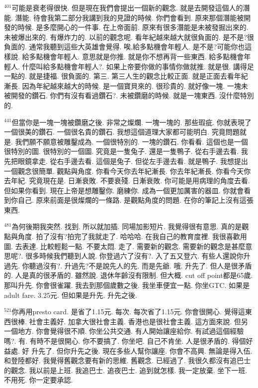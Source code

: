 \documentclass{book}
\begin{document}
$^{401}$可能是衰老得很快.
但是現在我們會提出一個新的觀念.
就是去開發這個人的潛能.
潛能.
待會我第二部分我講到我的見證的時候.
你們會看到.
原來那個潛能被開發的時候.
是多麼開心的一件事.
在上帝面前.
原來有很多潛能是未被發掘出來的.
未被爆出來的.
有爆炸力的.
以前的觀念呢.
看年紀越來越大就很負面的.
是不是?很負面的.
通常我聽到這些大英雄會覺得.
唉,給多點機會年輕人.
是不是?可能你也這樣說.
給多點機會年輕人.
意思就是你推.
就是你不想再背一些東西.
給多點機會年輕人.
什麼叫給多點機會年輕人?.
如果上帝要你做的事情你做就推.
就是很.
講得足一點的.
就是捷福.
很負面的.
第三.
第三人生的觀念比較正面.
就是正面去看年紀漸長.
因為年紀越來越大的時候.
是一個寶貝來的.
很珍貴的.
就好像一塊.
一塊未被開發的鑽石.
你們有沒有看過鑽石?.
未被鑽磨的時候.
就是一塊東西.
沒什麼特別的.

$^{441}$但當你是一塊一塊被鑽磨之後.
非常之燦爛.
一塊一塊的.
那些瑕疵.
你就表現了一個很美的鑽石.
一個很名貴的鑽石.
我想這個道理大家都可能明白.
究竟問題就是.
我們願不願意被雕鑿成為.
一個很特別的.
一塊的鑽石.
你看看.
這個也是一個很特別的圖.
很特別的一個圖.
究竟是一隻兔子.
還是一隻鴨子.
從右手邊去看.
我先把眼鏡拿走.
從右手邊去看.
這個是兔子.
但從左手邊去看.
就是鴨子.
我想提出一個觀念很簡單.
觀點與角度.
你看今天你去年紀漸長.
你去年紀漸長.
你看今天你去年紀.
究竟現在是.
日漸衰敗.
不要衰殘.
日漸衰敗.
你可能是用病理的角度去看.
但如果你看到.
現在上帝是想雕鑿你.
磨練你.
成為一個更加厲害的器皿.
你就會看到你自己.
原來前面是很燦爛的一條路.
是觀點角度的問題.
在你的筆記上沒有這張東西.

$^{481}$為何後期我突然.
找到.
所以就加插.
同場加影短片.
我覺得很有意思.
真的是觀點與角度.
拍了沒有?拍完了我就走了.
哈哈哈.
在我自己的教育度裡.
我很喜歡用圖.
去表達.
比較輕鬆一點.
不要太悶.
走了.
需要新的觀念.
需要新的觀念是甚麼意思呢?.
很多時候我們聽到人說.
你登過六了沒有?.
入了五又登六.
有些人還說你升過先.
你聽過沒有?.
升過先?不是說先人的先.
而是先爺.
哦.
升先了.
但人是很矛盾的.
人是真的很矛盾的.
雖然說.
退休年齡沒有限制.
但大概.
cut off point都是65歲.
那叫升先.
你會很雀躍.
我去到那個歲數之後.
我坐車便宜一點.
你坐GTC.
如果是adult fare.
3.25元.
但如果是升先.
升先之後.

$^{521}$你再用presto card.
是省了1.15元.
每次.
每次省了1.15元.
你會很開心.
覺得這東西很棒.
社會主義好.
加拿大很社會主義.
香港也是很社會主義.
這方面來說.
但另一個地方.
你會覺得很不順.
你坐公共交通.
有人開始讓座給你.
有試過這個經驗嗎?.
有.
有時不是很開心.
你不要搞了.
你坐吧.
自己不肯坐.
人是很矛盾的.
得個好益處.
好 升先了.
但你升先之後.
現在多些人幫你讓座.
你會不高興.
無論是得入伍.
和登陸都好.
我覺得舊觀念要有新的思維.
舊觀念.
已經過了.
我很久都沒有追巴士的觀念.
我以前是上班.
我追巴士.
追夜巴士.
追到就怎樣.
我一定放棄.
坐下一班.
不用死.
你一定要承認.
\end{document}
